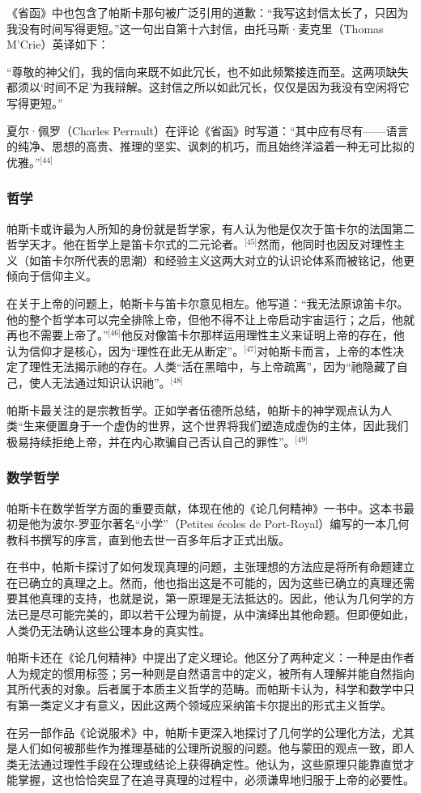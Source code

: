 《省函》中也包含了帕斯卡那句被广泛引用的道歉：“我写这封信太长了，只因为我没有时间写得更短。”这一句出自第十六封信，由托马斯·麦克里（Thomas M'Crie）英译如下：

“尊敬的神父们，我的信向来既不如此冗长，也不如此频繁接连而至。这两项缺失都须以‘时间不足’为我辩解。这封信之所以如此冗长，仅仅是因为我没有空闲将它写得更短。”

夏尔·佩罗（Charles Perrault）在评论《省函》时写道：“其中应有尽有——语言的纯净、思想的高贵、推理的坚实、讽刺的机巧，而且始终洋溢着一种无可比拟的优雅。”\(^\text{[44]}\)
\subsubsection{哲学}
帕斯卡或许最为人所知的身份就是哲学家，有人认为他是仅次于笛卡尔的法国第二哲学天才。他在哲学上是笛卡尔式的二元论者。\(^\text{[45]}\)然而，他同时也因反对理性主义（如笛卡尔所代表的思潮）和经验主义这两大对立的认识论体系而被铭记，他更倾向于信仰主义。

在关于上帝的问题上，帕斯卡与笛卡尔意见相左。他写道：“我无法原谅笛卡尔。他的整个哲学本可以完全排除上帝，但他不得不让上帝启动宇宙运行；之后，他就再也不需要上帝了。”\(^\text{[46]}\)他反对像笛卡尔那样运用理性主义来证明上帝的存在，他认为信仰才是核心，因为“理性在此无从断定”。\(^\text{[47]}\)对帕斯卡而言，上帝的本性决定了理性无法揭示祂的存在。人类“活在黑暗中，与上帝疏离”，因为“祂隐藏了自己，使人无法通过知识认识祂”。\(^\text{[48]}\)

帕斯卡最关注的是宗教哲学。正如学者伍德所总结，帕斯卡的神学观点认为人类“生来便置身于一个虚伪的世界，这个世界将我们塑造成虚伪的主体，因此我们极易持续拒绝上帝，并在内心欺骗自己否认自己的罪性”。\(^\text{[49]}\)
\subsubsection{数学哲学}
帕斯卡在数学哲学方面的重要贡献，体现在他的《论几何精神》一书中。这本书最初是他为波尔-罗亚尔著名“小学”（Petites écoles de Port-Royal）编写的一本几何教科书撰写的序言，直到他去世一百多年后才正式出版。

在书中，帕斯卡探讨了如何发现真理的问题，主张理想的方法应是将所有命题建立在已确立的真理之上。然而，他也指出这是不可能的，因为这些已确立的真理还需要其他真理的支持，也就是说，第一原理是无法抵达的。因此，他认为几何学的方法已是尽可能完美的，即以若干公理为前提，从中演绎出其他命题。但即便如此，人类仍无法确认这些公理本身的真实性。

帕斯卡还在《论几何精神》中提出了定义理论。他区分了两种定义：一种是由作者人为规定的惯用标签；另一种则是自然语言中的定义，被所有人理解并能自然指向其所代表的对象。后者属于本质主义哲学的范畴。而帕斯卡认为，科学和数学中只有第一类定义才有意义，因此这两个领域应采纳笛卡尔提出的形式主义哲学。

在另一部作品《论说服术》中，帕斯卡更深入地探讨了几何学的公理化方法，尤其是人们如何被那些作为推理基础的公理所说服的问题。他与蒙田的观点一致，即人类无法通过理性手段在公理或结论上获得确定性。他认为，这些原理只能靠直觉才能掌握，这也恰恰突显了在追寻真理的过程中，必须谦卑地归服于上帝的必要性。
